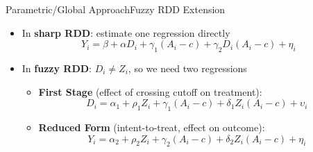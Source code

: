 \documentclass[hyperref={pdfpagelabels=false}]{beamer}
\begin{document}
\begin{frame}{Parametric/Global Approach}{Fuzzy RDD Extension}
	\begin{itemize}
		\item In \textbf{sharp RDD}: estimate one regression directly
		\begin{equation*}
			Y_i = \beta + \alpha D_i + \gamma_1(A_i - c) + \gamma_2 D_i(A_i - c) + \eta_i
		\end{equation*}
		\vspace{0.1cm}
		\item In \textbf{fuzzy RDD}: $D_i \ne Z_i$, so we need two regressions
		\vspace{0.2cm}
		\begin{itemize}
			\item \textbf{First Stage} (effect of crossing cutoff on treatment):
			\begin{equation*}
				D_i = \alpha_1 + \rho_1 Z_i + \gamma_1(A_i-c) + \delta_1 Z_i(A_i-c) + \upsilon_i
			\end{equation*}
			\vspace{0.1cm}
			\item \textbf{Reduced Form} (intent-to-treat, effect on outcome):
			\begin{equation*}
				Y_i = \alpha_2 + \rho_2 Z_i + \gamma_2(A_i-c) + \delta_2 Z_i(A_i-c) + \eta_i
			\end{equation*}
		\end{itemize}
	\end{itemize}
\end{frame}
\end{document}
